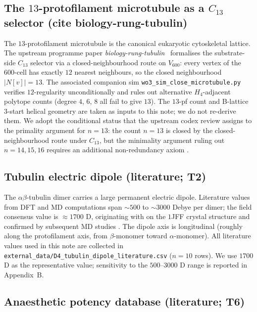 \documentclass[11pt,a4paper]{article}
\begin{document}
\subsection{The $13$-protofilament microtubule as a $C_{13}$ selector (cite biology-rung-tubulin)}

The $13$-protofilament microtubule is the canonical eukaryotic
cytoskeletal lattice. The upstream programme paper
\emph{biology-rung-tubulin}~\cite{SmartTubulin} formalises the
substrate-side $C_{13}$ selector via a closed-neighbourhood route on
$V_{600}$: every vertex of the $600$-cell has exactly $12$ nearest
neighbours, so the closed neighbourhood $|N[v]| = 13$. The associated
companion sim \texttt{wo3\_sim\_close\_microtubule.py}
verifies $12$-regularity unconditionally and rules out alternative
$H_4$-adjacent polytope counts (degree $4$, $6$, $8$ all fail to give
$13$). The $13$-pf count and B-lattice $3$-start helical geometry
are taken as inputs to this note; we do not re-derive them. We adopt the
conditional status that the upstream codex review assigns to the
primality argument for $n=13$: the count $n=13$ is closed by the
closed-neighbourhood route under $C_{13}$, but the minimality argument
ruling out $n=14,15,16$ requires an additional non-redundancy axiom
\cite{SmartTubulin}.

\subsection{Tubulin electric dipole (literature; \textsf{T2})}

The $\alpha\beta$-tubulin dimer carries a large permanent electric
dipole. Literature values from DFT and MD computations span $\sim 500$ to
$\sim 3000$ Debye per dimer; the field consensus value is
$\approx 1700$ D, originating with \citet{Mershin2004} on the $1$JFF
crystal structure and confirmed by subsequent MD studies
\cite{Craddock2009, Tuszynski2014, Kalra2020}. The dipole axis is
longitudinal (roughly along the protofilament axis, from $\beta$-monomer
toward $\alpha$-monomer). All literature values used in this note are
collected in \texttt{external\_data/D4\_tubulin\_dipole\_literature.csv}
($n=10$ rows). We use $1700$ D as the representative value; sensitivity
to the $500$--$3000$ D range is reported in Appendix~B.

\subsection{Anaesthetic potency database (literature; \textsf{T6})}
\end{document}
